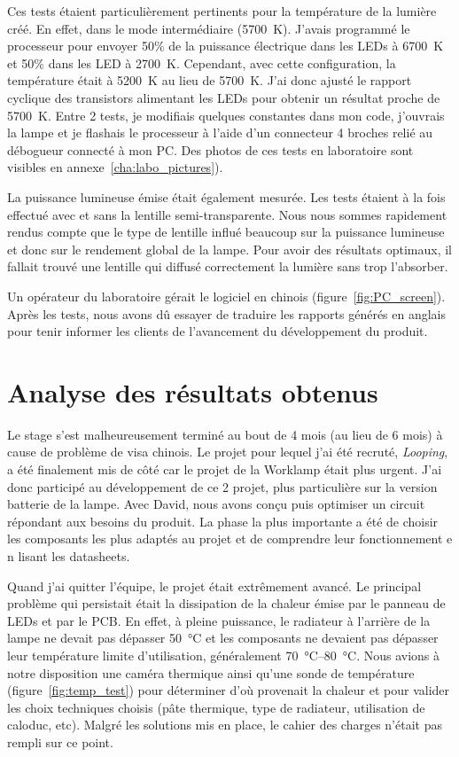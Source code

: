 \documentclass[a4paper, 12pt]{report}
\begin{document}
Ces tests étaient particulièrement pertinents pour la température de la lumière créé. En effet, dans le mode intermédiaire (\SI{5700}{\kelvin}). J'avais programmé le processeur pour envoyer 50\% de la puissance électrique dans les LEDs à \SI{6700}{\kelvin} et 50\% dans les LED à \SI{2700}{\kelvin}. Cependant, avec cette configuration, la température était à \SI{5200}{\kelvin} au lieu de \SI{5700}{\kelvin}. J'ai donc ajusté le rapport cyclique des transistors alimentant les LEDs pour obtenir un résultat proche de \SI{5700}{\kelvin}. Entre 2 tests, je modifiais quelques constantes dans mon code, j'ouvrais la lampe et je flashais le processeur à l'aide d'un connecteur 4 broches relié au débogueur connecté à mon PC. Des photos de ces tests en laboratoire sont visibles en annexe~\ref{cha:labo_pictures}).

La puissance lumineuse émise était également mesurée. Les tests étaient à la fois effectué avec et sans la lentille semi-transparente. Nous nous sommes rapidement rendus compte que le type de lentille influé beaucoup sur la puissance lumineuse et donc sur le rendement global de la lampe. Pour avoir des résultats optimaux, il fallait trouvé une lentille qui diffusé correctement la lumière sans trop l'absorber.

Un opérateur du laboratoire gérait le logiciel en chinois (figure~\ref{fig:PC_screen}). Après les tests, nous avons dû essayer de traduire les rapports générés en anglais pour tenir informer les clients de l'avancement du développement du produit.  


\chapter{Analyse des résultats obtenus}

Le stage s'est malheureusement terminé au bout de 4 mois (au lieu de 6 mois) à cause de problème de visa chinois. Le projet pour lequel j'ai été recruté, \emph{Looping}, a été finalement mis de côté car le projet de la Worklamp était plus urgent. J'ai donc participé au développement de ce 2\ieme{} projet, plus particulière sur la version batterie de la lampe. Avec David, nous avons conçu puis optimiser un circuit répondant aux besoins du produit. La phase la plus importante a été de choisir les composants les plus adaptés au projet et de comprendre leur fonctionnement e n lisant les datasheets.

Quand j'ai quitter l'équipe, le projet était extrêmement avancé. Le principal problème qui persistait était la dissipation de la chaleur émise par le panneau de LEDs et par le PCB. En effet, à pleine puissance, le radiateur à l'arrière de la lampe ne devait pas dépasser \SI{50}{\celsius} et les composants ne devaient pas dépasser leur température limite d'utilisation, généralement \SIrange{70}{80}{\celsius}. Nous avions à notre disposition une caméra thermique ainsi qu'une sonde de température (figure~\ref{fig:temp_test}) pour déterminer d'où provenait la chaleur et pour valider les choix techniques choisis (pâte thermique, type de radiateur, utilisation de caloduc, etc). Malgré les solutions mis en place, le cahier des charges n'était pas rempli sur ce point.
\end{document}
